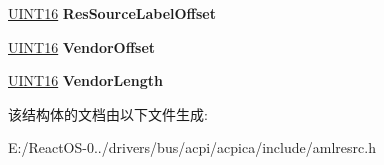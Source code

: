 \begin{DoxyCompactItemize}
\hyperlink{_processor_bind_8h_a09f1a1fb2293e33483cc8d44aefb1eb1}{U\+I\+N\+T16} {\bfseries Res\+Source\+Label\+Offset}
\item 
\mbox{\label{structaml__resource__pin__group__function_a89e931760449d2083fd8f7465bd05508}} 
\hyperlink{_processor_bind_8h_a09f1a1fb2293e33483cc8d44aefb1eb1}{U\+I\+N\+T16} {\bfseries Vendor\+Offset}
\item 
\mbox{\label{structaml__resource__pin__group__function_a13fcc22cec62f67870844750d93985aa}} 
\hyperlink{_processor_bind_8h_a09f1a1fb2293e33483cc8d44aefb1eb1}{U\+I\+N\+T16} {\bfseries Vendor\+Length}
\end{DoxyCompactItemize}


该结构体的文档由以下文件生成\+:\begin{DoxyCompactItemize}
\item 
E\+:/\+React\+O\+S-\/0../drivers/bus/acpi/acpica/include/amlresrc.\+h\end{DoxyCompactItemize}
